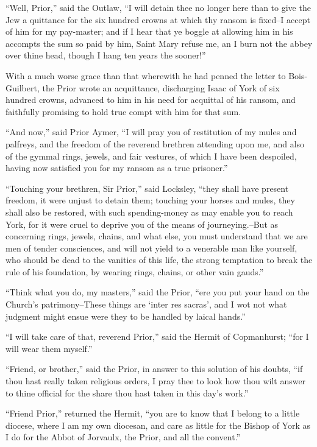 ``Well, Prior,'' said the Outlaw, ``I will detain thee no longer here
than to give the Jew a quittance for the six hundred crowns at which thy
ransom is fixed--I accept of him for my pay-master; and if I hear that
ye boggle at allowing him in his accompts the sum so paid by him, Saint
Mary refuse me, an I burn not the abbey over thine head, though I hang
ten years the sooner!''

With a much worse grace than that wherewith he had penned the letter to
Bois-Guilbert, the Prior wrote an acquittance, discharging Isaac of York
of six hundred crowns, advanced to him in his need for acquittal of his
ransom, and faithfully promising to hold true compt with him for that
sum.

``And now,'' said Prior Aymer, ``I will pray you of restitution of my
mules and palfreys, and the freedom of the reverend brethren attending
upon me, and also of the gymmal rings, jewels, and fair vestures, of
which I have been despoiled, having now satisfied you for my ransom as a
true prisoner.''

``Touching your brethren, Sir Prior,'' said Locksley, ``they shall have
present freedom, it were unjust to detain them; touching your horses and
mules, they shall also be restored, with such spending-money as may
enable you to reach York, for it were cruel to deprive you of the means
of journeying.--But as concerning rings, jewels, chains, and what else,
you must understand that we are men of tender consciences, and will not
yield to a venerable man like yourself, who should be dead to the
vanities of this life, the strong temptation to break the rule of his
foundation, by wearing rings, chains, or other vain gauds.''

``Think what you do, my masters,'' said the Prior, ``ere you put your
hand on the Church's patrimony--These things are `inter res sacras', and
I wot not what judgment might ensue were they to be handled by laical
hands.''

``I will take care of that, reverend Prior,'' said the Hermit of
Copmanhurst; ``for I will wear them myself.''

``Friend, or brother,'' said the Prior, in answer to this solution of
his doubts, ``if thou hast really taken religious orders, I pray thee to
look how thou wilt answer to thine official for the share thou hast
taken in this day's work.''

``Friend Prior,'' returned the Hermit, ``you are to know that I belong
to a little diocese, where I am my own diocesan, and care as little for
the Bishop of York as I do for the Abbot of Jorvaulx, the Prior, and all
the convent.''

